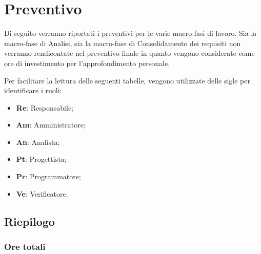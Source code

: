 \documentclass[../piano-di-progetto.tex]{subfiles}
\begin{document}
  \section{Preventivo}
  Di seguito verranno riportati i preventivi per le varie macro-fasi di lavoro. Sia la macro-fase di Analisi, sia la macro-fase di Consolidamento dei requisiti non verranno rendicontate nel preventivo finale in quanto vengono considerate come ore di investimento per l’approfondimento personale.

  Per facilitare la lettura delle seguenti tabelle, vengono utilizzate delle sigle per identificare i ruoli:
  \begin{itemize}
    \item \textbf{Re}: Responsabile;
    \item \textbf{Am}: Amministratore;
    \item \textbf{An}: Analista;
    \item \textbf{Pt}: Progettista;
    \item \textbf{Pr}: Programmatore;
    \item \textbf{Ve}: Verificatore.
  \end{itemize}

  
  
  
  
  

  \subsection{Riepilogo}
  \subsubsection{Ore totali}
\end{document}
